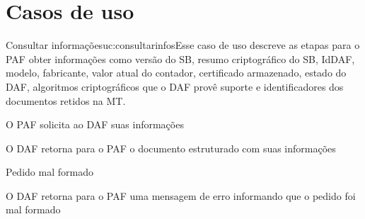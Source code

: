 \documentclass[11pt]{ifscarticle}
\begin{document}
\section{Casos de uso}\label{sec:casos_de_uso}


\begin{usecase}{Consultar informações}{uc:consultarinfos}{Esse caso de uso descreve as etapas para o PAF obter informações como versão do SB, resumo criptográfico do SB, IdDAF, modelo, fabricante, valor atual do contador, certificado armazenado, estado do DAF, algoritmos criptográficos que o DAF provê suporte e identificadores dos documentos retidos na MT.}
    \begin{cabecalhoUC}
    \end{cabecalhoUC}

    \begin{fluxoprincipal}
        \item O PAF solicita ao DAF suas informações 
        \item O DAF retorna para o PAF o documento estruturado com suas informações
    \end{fluxoprincipal}  

    \begin{fluxoexcecao}{Pedido mal formado}
        \item O DAF retorna para o PAF uma mensagem de erro informando que o pedido foi mal formado
    \end{fluxoexcecao}   
\end{usecase}


\printbibliography[heading=bibintoc,title={Referências}]%
\end{document}
